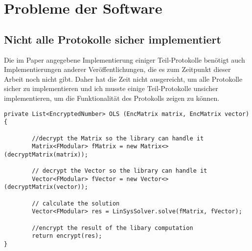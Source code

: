 \chapter{Probleme der Software}

\section{Nicht alle Protokolle sicher implementiert}
Die im Paper angegebene Implementierung einiger Teil-Protokolle benötigt auch Implementierungen anderer Veröffentlichungen, die es zum Zeitpunkt dieser Arbeit noch nicht gibt. Daher hat die Zeit nicht ausgereicht, um alle Protokolle sicher zu implementieren und ich  musste einige Teil-Protokolle unsicher implementieren, um die Funktionalität des Protokolls zeigen zu können.\\

\begin{lstlisting}[caption = Ausschnitt aus der unsicheren Implementierung von OLS (vereinfacht), label = {Code:OLS}]
private List<EncryptedNumber> OLS (EncMatrix matrix, EncMatrix vector){

		//decrypt the Matrix so the library can handle it
        Matrix<FModular> fMatrix = new Matrix<>(decryptMatrix(matrix));

        // decrypt the Vector so the library can handle it
        Vector<FModular> fVector = new Vector<>(decryptMatrix(vector));

        // calculate the solution
        Vector<FModular> res = LinSysSolver.solve(fMatrix, fVector);
        
        //encrypt the result of the libary computation
        return encrypt(res);
}
\end{lstlisting}


